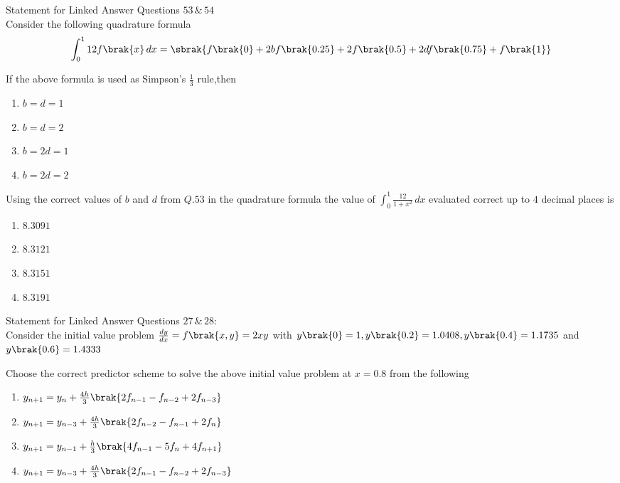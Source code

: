  \iffalse
\chapter{2010}
\author{EE24BTECH11021 - Eshan Ray}
\section{xe}
\fi
   \item[] Statement for Linked Answer Questions $53\,\&\,54$\\
    Consider the following quadrature formula\\
    $$\int_{0}^{1}12f\brak{x}\,dx=\sbrak{f\brak{0}+2bf\brak{0.25}+2f\brak{0.5}+2df\brak{0.75}+f\brak{1}}$$
    \item If the above formula is used as Simpson's $\frac{1}{3}$ rule,then
    \begin{enumerate}
        \item $b=d=1$
        \item $b=d=2$
        \item $b=2d=1$
        \item $b=2d=2$
    \end{enumerate}
    \item Using the correct values of $b$ and $d$ from $Q.53$ in the quadrature formula the value of $\int_{0}^{1}\frac{12}{1+x^2}\,dx$ evaluated correct up to $4$ decimal places is  
    \begin{enumerate}
        \item $8.3091$
        \item $8.3121$
        \item $8.3151$
        \item $8.3191$
    \end{enumerate}
    \item[] Statement for Linked Answer Questions  $27\,\&\,28\colon$\\
    Consider the initial value problem $\frac{dy}{dx}=f\brak{x,y}=2xy$ with $y\brak{0}=1,y\brak{0.2}=1.0408,y\brak{0.4}=1.1735$ and $y\brak{0.6}=1.4333$
    \item Choose the correct predictor scheme to solve the above initial value problem at $x=0.8$ from the following
    \begin{enumerate}
        \item $y_{n+1}=y_n+\frac{4h}{3}\brak{2f_{n-1}-f_{n-2}+2f_{n-3}}$
        \item $y_{n+1}=y_{n-3}+\frac{4h}{3}\brak{2f_{n-2}-f_{n-1}+2f_{n}}$
        \item $y_{n+1}=y_{n-1}+\frac{h}{3}\brak{4f_{n-1}-5f_{n}+4f_{n+1}}$
        \item $y_{n+1}=y_{n-3}+\frac{4h}{3}\brak{2f_{n-1}-f_{n-2}+2f_{n-3}}$
    \end{enumerate}
